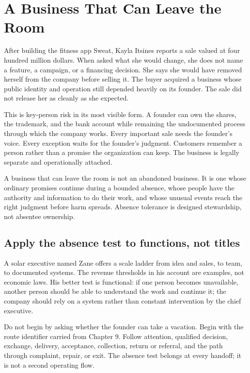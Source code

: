 \chapter{A Business That Can Leave the Room}

After building the fitness app Sweat, Kayla Itsines reports a sale valued at
four hundred million dollars. When asked what she would change, she does not
name a feature, a campaign, or a financing decision. She says she would have
removed herself from the company before selling it. The buyer acquired a
business whose public identity and operation still depended heavily on its
founder. The sale did not release her as cleanly as she expected.

This is key-person risk in its most visible form. A founder can own the shares,
the trademark, and the bank account while remaining the undocumented process
through which the company works. Every important sale needs the founder's
voice. Every exception waits for the founder's judgment. Customers remember a
person rather than a promise the organization can keep. The business is legally
separate and operationally attached.

A business that can leave the room is not an abandoned business. It is one
whose ordinary promises continue during a bounded absence, whose people have
the authority and information to do their work, and whose unusual events reach
the right judgment before harm spreads. Absence tolerance is designed
stewardship, not absentee ownership.

\section{Apply the absence test to functions, not titles}

A solar executive named Zane offers a scale ladder from idea and sales, to team,
to documented systems. The revenue thresholds in his account are examples,
not economic laws. His better test is functional: if one person becomes
unavailable, another person should be able to understand the work and continue
it; the company should rely on a system rather than constant intervention by
the chief executive.

Do not begin by asking whether the founder can take a vacation. Begin with the
route identifier carried from Chapter 9. Follow attention, qualified decision,
exchange, delivery, acceptance, collection, return or referral, and the path
through complaint, repair, or exit. The absence test belongs at every handoff;
it is not a second operating flow.

